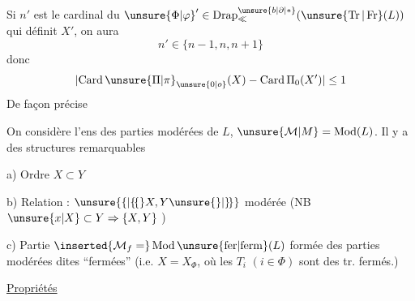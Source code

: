 
Si $n'$ est le cardinal du $ {\unsure{\Phi|\varphi}}'\in\operatorname{Drap}_{\ll}^{\unsure{b|\partial|*}}(\unsure{\operatorname{Tr}|\operatorname{Fr}}(L))$ qui définit $X'$, on aura
\[
n'\in\{n-1,n,n+1\}
\]
donc
\[
\lvert\operatorname{Card}\unsure{\Pi|\pi}_{\unsure{0|o}}(X)-\operatorname{Card}\Pi_0(X')\rvert\leq 1
\]
De façon précise

On considère l'ens   des parties modérées de $L$, $\unsure{\mathcal M|M}=\operatorname{Mod}(L)$. Il y a des structures remarquables

a) Ordre \quad $X\subset Y$

b) Relation : $\unsure{\{|\lbrace\!\lbrace}X,Y\unsure{\}|\rbrace\!\rbrace}$ modérée \quad (NB $\unsure{x|X}\subset Y\Rightarrow\{X,Y\}$ )

c) Partie $\inserted{\mathcal M_f=}\operatorname{Mod}\unsure{\mathrm{fer}|\mathrm{ferm}}(L)$ formée des parties modérées dites ``fermées'' (i.e. $X=X_{\Phi}$, où les $T_i$ $(i\in\Phi)$ sont des  tr. fermés.)

\uline{Propriétés}
